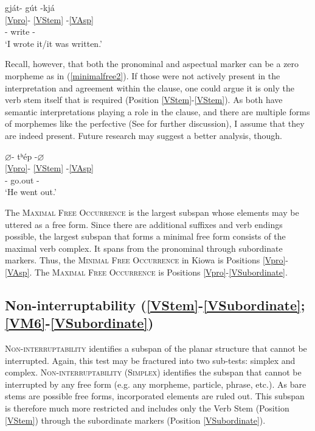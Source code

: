 \documentclass[output=paper]{langscibook}
\begin{document}
\ea \label{minimalfree}
\glll gját- gút -kjá\\
{\ref{Vpro}}- \ref{VStem} -\ref{VAsp}\\
[\First\Sg/\Aarg:\Pl/\Obj]- write -{\Pfv}\\
\trans `I wrote it/it was written.' \citep[][85]{Miller:2018}
\z

\noindent Recall, however, that both the pronominal and aspectual marker can be a zero morpheme as in (\ref{minimalfree2}). If those were not actively present in the interpretation and agreement within the clause, one could argue it is only the verb stem itself that is required (Position \ref{VStem}-\ref{VStem}). As both have semantic interpretations playing a role in the clause, and there are multiple forms of morphemes like the perfective (See  for further discussion), I assume that they are indeed present. Future research may suggest a better analysis, though.

\ea \label{minimalfree2}
\glll $\varnothing$- tʰép -$\varnothing$\\
{\ref{Vpro}}- \ref{VStem} -\ref{VAsp}\\
[\Third\Sg]- go.out -{\Pfv}\\
\trans `He went out.' \citep[adapted from][44]{Miller:2018}
\z

\noindent The {\textsc{Maximal Free Occurrence}} is the largest subspan whose elements may be uttered as a free form. Since there are additional suffixes and verb endings possible, the largest subspan that forms a minimal free form consists of the maximal verb complex. It spans from the pronominal through subordinate markers. Thus, the {\textsc{Minimal Free Occurrence}} in Kiowa is Positions \ref{Vpro}-\ref{VAsp}. The {\textsc{Maximal Free Occurrence}} is Positions \ref{Vpro}-\ref{VSubordinate}.

\subsection{Non-interruptability (\ref{VStem}-\ref{VSubordinate}; \ref{VM6}-\ref{VSubordinate})} \label{sec:non-interruptability}

{\textsc{Non-interruptability}} identifies a subspan of the planar structure that cannot be interrupted. Again, this test may be fractured into two sub-tests: simplex and complex. {\textsc{Non-interruptability (Simplex)}} identifies the subspan that cannot be interrupted by any free form (e.g. any morpheme, particle, phrase, etc.). As bare stems are possible free forms, incorporated elements are ruled out. This subspan is therefore much more restricted and includes only the Verb Stem (Position \ref{VStem}) through the subordinate markers (Position \ref{VSubordinate}). 
\end{document}
